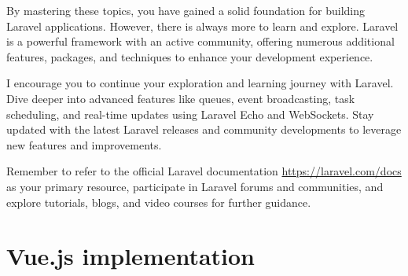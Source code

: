 By mastering these topics, you have gained a solid foundation for building Laravel applications. However, there is always more to learn and explore. Laravel is a powerful framework with an active community, offering numerous additional features, packages, and techniques to enhance your development experience.

I encourage you to continue your exploration and learning journey with Laravel. Dive deeper into advanced features like queues, event broadcasting, task scheduling, and real-time updates using Laravel Echo and WebSockets. Stay updated with the latest Laravel releases and community developments to leverage new features and improvements.

Remember to refer to the official Laravel documentation \url{https://laravel.com/docs} as your primary resource, participate in Laravel forums and communities, and explore tutorials, blogs, and video courses for further guidance.
\newpage
\section{Vue.js implementation}
